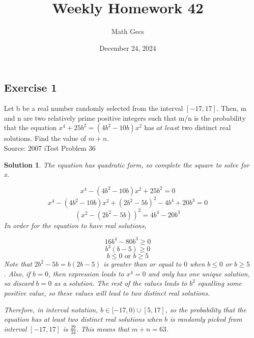 \documentclass[12pt]{article}
\title{Weekly Homework 42}
\author{Math Gecs}
\date{December 24, 2024}
\newtheorem*{solution*}{Solution}
\begin{document}
\maketitle

\subsection*{Exercise 1}
Let b be a real number randomly selected from the interval $[-17,17]$. Then, m and n are two relatively prime positive integers such that m/n is the probability that the equation $x^4+25b^2=(4b^2-10b)x^2$ has $\textit{at least}$ two distinct real solutions. Find the value of $m+n$.\\

Source: 2007 iTest Problem 36\\

\begin{solution*}
The equation has quadratic form, so complete the square to solve for x.

\[x^4 - (4b^2 - 10b)x^2 + 25b^2 = 0\]\[x^4 - (4b^2 - 10b)x^2 + (2b^2 - 5b)^2 - 4b^4 + 20b^3 = 0\]\[(x^2 - (2b^2 - 5b))^2 = 4b^4 - 20b^3\]
In order for the equation to have real solutions,

\[16b^4 - 80b^3 \ge 0\]\[b^3(b - 5) \ge 0\]\[b \le 0 \text{ or } b \ge 5\]
Note that $2b^2 - 5b = b(2b-5)$ is greater than or equal to $0$ when $b \le 0$ or $b \ge 5$. Also, if $b = 0$, then expression leads to $x^4 = 0$ and only has one unique solution, so discard $b = 0$ as a solution. The rest of the values leads to $b^2$ equalling some positive value, so these values will lead to two distinct real solutions.

Therefore, in interval notation, $b \in [-17,0) \cup [5,17]$, so the probability that the equation has at least two distinct real solutions when $b$ is randomly picked from interval $[-17,17]$ is $\frac{29}{34}$. This means that $m+n = \boxed{63}$.
\end{solution*}
\end{document}
